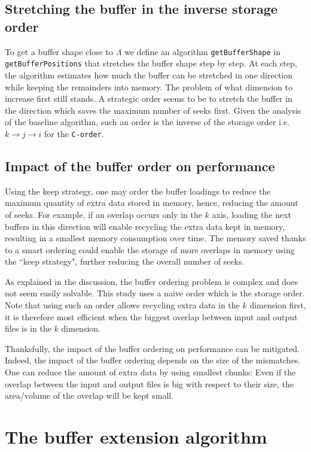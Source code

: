 \documentclass[conference]{IEEEtran}
\begin{document}
\subsection{Stretching the buffer in the inverse storage order}
To get a buffer shape close to $\Lambda$ we define an algorithm
\texttt{getBufferShape} in \texttt{getBufferPositions} that stretches the
buffer shape step by step. At each step, the algorithm estimates how much the
buffer can be stretched in one direction while keeping the remainders into
memory. The problem of what dimension to increase first still stands. A
strategic order seems to be to stretch the buffer in the direction which saves
the maximum number of seeks first. Given the analysis of the baseline algorithm,
such an order is the inverse of the storage order i.e.
$k \rightarrow j \rightarrow i$ for the \texttt{C-order}.

\subsection{Impact of the buffer order on performance}
Using the keep strategy, one may order the buffer loadings to reduce the maximum
quantity of extra data stored in memory, hence, reducing the amount of seeks.
For example, if an overlap occurs only in the $k$ axis, loading the next buffers
in this direction will enable recycling the extra data kept in memory, resulting
in a smallest memory consumption over time. The memory saved thanks to a smart
ordering could enable the storage of more overlaps in memory using the
``keep strategy", further reducing the overall number of seeks.

As explained in the discussion, the buffer ordering problem is complex and does
not seem easily solvable.
This study uses a naive order which is the storage order. Note that using such
an order allows recycling extra data in the $k$ dimension first, it is therefore
most efficient when the biggest overlap between input and output files is in the
$k$ dimension.

Thanksfully, the impact of the buffer ordering on performance can be
mitigated. Indeed, the impact of the buffer ordering depends on the size of the
mismatches. One can reduce the amount of extra data by using smallest chunks: Even
if the overlap between the input and output files is big with respect to their
size, the area/volume of the overlap will be kept small.

\section{The buffer extension algorithm}
\end{document}
